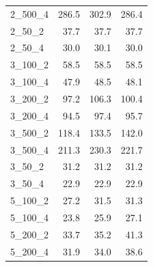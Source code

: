 \begin{tabular}{lrrr}
 2\_500\_4 &                  286.5 &                                              302.9 &                                              286.4 \\
  2\_50\_2 &                   37.7 &                                               37.7 &                                               37.7 \\
  2\_50\_4 &                   30.0 &                                               30.1 &                                               30.0 \\
 3\_100\_2 &                   58.5 &                                               58.5 &                                               58.5 \\
 3\_100\_4 &                   47.9 &                                               48.5 &                                               48.1 \\
 3\_200\_2 &                   97.2 &                                              106.3 &                                              100.4 \\
 3\_200\_4 &                   94.5 &                                               97.4 &                                               95.7 \\
 3\_500\_2 &                  118.4 &                                              133.5 &                                              142.0 \\
 3\_500\_4 &                  211.3 &                                              230.3 &                                              221.7 \\
  3\_50\_2 &                   31.2 &                                               31.2 &                                               31.2 \\
  3\_50\_4 &                   22.9 &                                               22.9 &                                               22.9 \\
 5\_100\_2 &                   27.2 &                                               31.5 &                                               31.3 \\
 5\_100\_4 &                   23.8 &                                               25.9 &                                               27.1 \\
 5\_200\_2 &                   33.7 &                                               35.2 &                                               41.3 \\
 5\_200\_4 &                   31.9 &                                               34.0 &                                               38.6 \\

\end{tabular}

